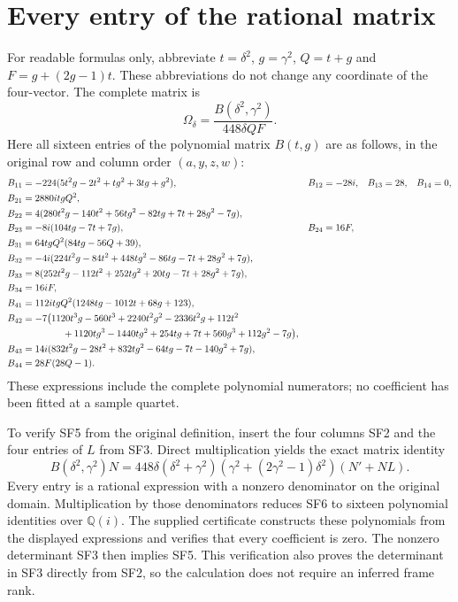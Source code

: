 \section{Every entry of the rational matrix}
For readable formulas only, abbreviate
$t=\delta^2$, $g=\gamma^2$, $Q=t+g$ and $F=g+(2g-1)t$.
These abbreviations do not change any coordinate of the four-vector.
The complete matrix is
\begin{equation}
 \boxed{\quad\Omega_\delta=
             \frac{B(\delta^2,\gamma^2)}{448\delta QF}.\quad}
 \tag{SF5}
\end{equation}
Here all sixteen entries of the polynomial matrix $B(t,g)$ are
as follows, in the original row and column order $(a,y,z,w)$:
\begin{align*}
 B_{11}&=-224(5t^2g-2t^2+tg^2+3tg+g^2),&
 B_{12}&=-28i,&B_{13}&=28,&B_{14}&=0,\\
 B_{21}&=2880it gQ^2,&&&&\\
 B_{22}&=4(280t^2g-140t^2+56tg^2-82tg+7t+28g^2-7g),&&&&\\
 B_{23}&=-8i(104tg-7t+7g),& B_{24}&=16F,&&&\\
 B_{31}&=64t gQ^2(84tg-56Q+39),&&&&\\
 B_{32}&=-4i(224t^2g-84t^2+448tg^2-86tg-7t+28g^2+7g),&&&&\\
 B_{33}&=8(252t^2g-112t^2+252tg^2+20tg-7t+28g^2+7g),&&&&\\
 B_{34}&=16iF,&&&&\\
 B_{41}&=112it gQ^2(1248tg-1012t+68g+123),&&&&\\
 B_{42}&=-7\bigl(1120t^3g-560t^3+2240t^2g^2-2336t^2g+112t^2&&&&\\
 &\hspace{15mm}+1120tg^3-1440tg^2+254tg+7t+560g^3+112g^2-7g\bigr),&&&&\\
 B_{43}&=14i(832t^2g-28t^2+832tg^2-64tg-7t-140g^2+7g),&&&&\\
 B_{44}&=28F(28Q-1).&&&&
\end{align*}
These expressions include the complete polynomial numerators;
no coefficient has been fitted at a sample quartet.

To verify SF5 from the original definition, insert the four
columns SF2 and the four entries of $L$ from SF3. Direct
multiplication yields the exact matrix identity
\begin{equation}
 B(\delta^2,\gamma^2)N
 =448\delta(\delta^2+\gamma^2)
       (\gamma^2+(2\gamma^2-1)\delta^2)(N'+NL).\tag{SF6}
\end{equation}
Every entry is a rational expression with a nonzero denominator
on the original domain. Multiplication by those denominators
reduces SF6 to sixteen polynomial identities over $\mathbb Q(i)$.
The supplied certificate constructs these polynomials from the
displayed expressions and verifies that every coefficient is zero.
The nonzero determinant SF3 then implies SF5. This verification
also proves the determinant in SF3 directly from SF2, so the
calculation does not require an inferred frame rank.


